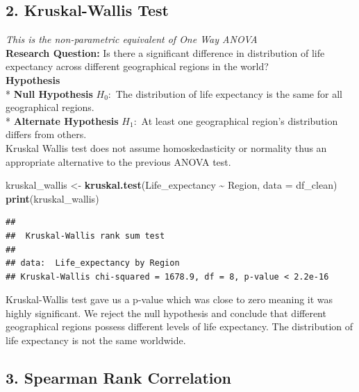 \documentclass[
  10pt,
]{article}
\newenvironment{Shaded}{\begin{snugshade}}{\end{snugshade}}
\newcommand{\AttributeTok}[1]{\textcolor[rgb]{0.13,0.29,0.53}{#1}}
\newcommand{\FunctionTok}[1]{\textcolor[rgb]{0.13,0.29,0.53}{\textbf{#1}}}
\newcommand{\NormalTok}[1]{#1}
\newcommand{\OtherTok}[1]{\textcolor[rgb]{0.56,0.35,0.01}{#1}}
\newcommand{\SpecialCharTok}[1]{\textcolor[rgb]{0.81,0.36,0.00}{\textbf{#1}}}
\begin{document}
\subsection{2. Kruskal-Wallis Test}\label{kruskal-wallis-test}

\emph{This is the non-parametric equivalent of One Way ANOVA}\\

\textbf{Research Question:} Is there a significant difference in
distribution of life expectancy across different geographical regions in
the world?\\

\textbf{Hypothesis}\\
* \textbf{Null Hypothesis} \(H_0:\) The distribution of life expectancy
is the same for all geographical regions.\\
* \textbf{Alternate Hypothesis} \(H_1:\) At least one geographical
region's distribution differs from others.\\

Kruskal Wallis test does not assume homoskedasticity or normality thus
an appropriate alternative to the previous ANOVA test.\\

\begin{Shaded}
\begin{Highlighting}[]
\NormalTok{kruskal\_wallis }\OtherTok{\textless{}{-}} \FunctionTok{kruskal.test}\NormalTok{(Life\_expectancy }\SpecialCharTok{\textasciitilde{}}\NormalTok{ Region, }\AttributeTok{data =}\NormalTok{ df\_clean)}
\FunctionTok{print}\NormalTok{(kruskal\_wallis)}
\end{Highlighting}
\end{Shaded}

\begin{verbatim}
## 
##  Kruskal-Wallis rank sum test
## 
## data:  Life_expectancy by Region
## Kruskal-Wallis chi-squared = 1678.9, df = 8, p-value < 2.2e-16
\end{verbatim}

Kruskal-Wallis test gave us a p-value which was close to zero meaning it
was highly significant. We reject the null hypothesis and conclude that
different geographical regions possess different levels of life
expectancy. The distribution of life expectancy is not the same
worldwide.\\

\subsection{3. Spearman Rank
Correlation}\label{spearman-rank-correlation}
\end{document}
